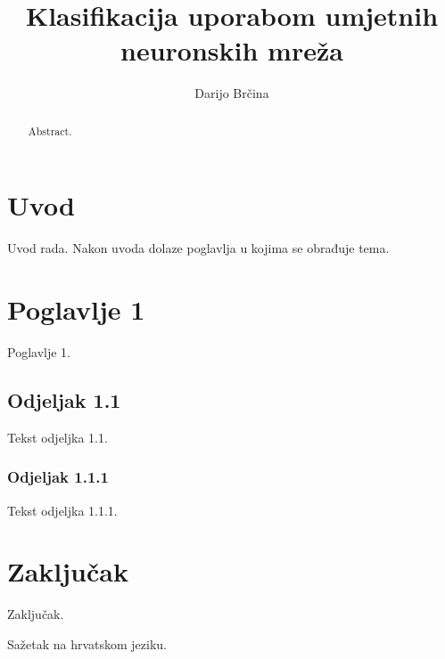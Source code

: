 \documentclass[times, utf8, zavrsni, numeric]{fer}
\begin{document}
\title{Klasifikacija uporabom umjetnih neuronskih mreža}
\author{Darijo Brčina}

\maketitle

\izvornik

\zahvala{}

\tableofcontents

\chapter{Uvod}
Uvod rada. Nakon uvoda dolaze poglavlja u kojima se obrađuje tema.

\chapter{Poglavlje 1}
Poglavlje 1.
\section{Odjeljak 1.1}
Tekst odjeljka 1.1.
\subsection{Odjeljak 1.1.1}
Tekst odjeljka 1.1.1.

\chapter{Zaključak}
Zaključak.



\nocite{*}

\begin{sazetak}
Sažetak na hrvatskom jeziku.

\end{sazetak}

\begin{abstract}
Abstract.

\end{abstract}
\end{document}
